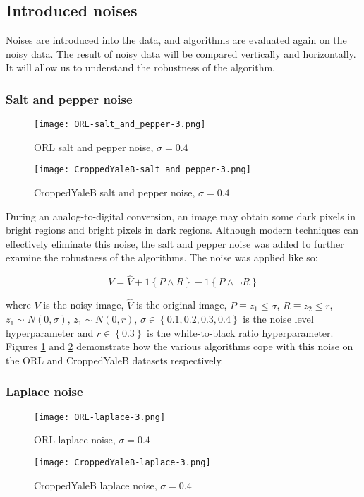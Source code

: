 \documentclass{article} %
\begin{document}
\subsection{Introduced noises}
Noises are introduced into the data, and algorithms are evaluated again on the noisy data. The result of noisy data will be compared vertically and horizontally. It will allow us to understand the robustness of the algorithm.

\subsubsection{Salt and pepper noise}
\begin{figure}
\texttt{[image: ORL-salt\_and\_pepper-3.png]}
\caption{ORL salt and pepper noise, $\sigma=0.4$ \label{fig:ORL-salt_and_pepper-3}}
\end{figure}
\begin{figure}
\texttt{[image: CroppedYaleB-salt\_and\_pepper-3.png]}
\caption{CroppedYaleB salt and pepper noise, $\sigma=0.4$ \label{fig:CroppedYaleB-salt_and_pepper-3}}
\end{figure}

During an analog-to-digital conversion, an image may obtain some dark pixels in bright regions and bright pixels in dark regions. \cite{noise} Although modern techniques can effectively eliminate this noise, the salt and pepper noise was added to further examine the robustness of the algorithms. The noise was applied like so:

\begin{equation}
V = \hat{V} + 1\left\{P \land R\right\} - 1\left\{P \land \lnot R\right\}
\end{equation}

where $V$ is the noisy image, $\hat{V}$ is the original image, $P \equiv z_1 \leq \sigma$, $R \equiv z_2 \leq r$, $z_1 \sim N\left(0,\sigma\right)$, $z_1 \sim N\left(0,r\right)$, $\sigma \in \left\{0.1,0.2,0.3,0.4\right\}$ is the noise level hyperparameter and $r \in \left\{0.3\right\} $ is the white-to-black ratio hyperparameter. Figures \ref{fig:ORL-salt_and_pepper-3} and \ref{fig:CroppedYaleB-salt_and_pepper-3} demonstrate how the various algorithms cope with this noise on the ORL and CroppedYaleB datasets respectively.

\subsubsection{Laplace noise}
\begin{figure}
\texttt{[image: ORL-laplace-3.png]}
\caption{ORL laplace noise, $\sigma=0.4$ \label{fig:ORL-laplace-3}}
\end{figure}
\begin{figure}
\texttt{[image: CroppedYaleB-laplace-3.png]}
\caption{CroppedYaleB laplace noise, $\sigma=0.4$ \label{fig:CroppedYaleB-laplace-3}}
\end{figure}
\end{document}
